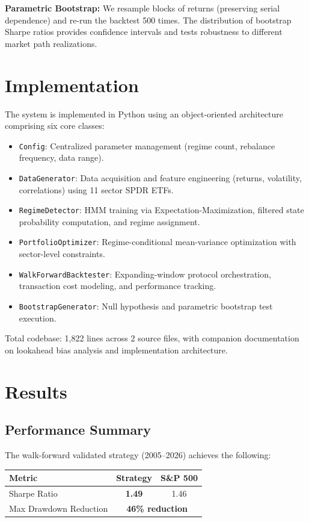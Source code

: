 \documentclass[11pt]{article}
\begin{document}
\textbf{Parametric Bootstrap:} We resample blocks of returns (preserving serial dependence) and re-run the backtest 500 times. The distribution of bootstrap Sharpe ratios provides confidence intervals and tests robustness to different market path realizations.

\section{Implementation}

The system is implemented in Python using an object-oriented architecture comprising six core classes:

\begin{itemize}[nosep]
    \item \texttt{Config}: Centralized parameter management (regime count, rebalance frequency, data range).
    \item \texttt{DataGenerator}: Data acquisition and feature engineering (returns, volatility, correlations) using 11 sector SPDR ETFs.
    \item \texttt{RegimeDetector}: HMM training via Expectation-Maximization, filtered state probability computation, and regime assignment.
    \item \texttt{PortfolioOptimizer}: Regime-conditional mean-variance optimization with sector-level constraints.
    \item \texttt{WalkForwardBacktester}: Expanding-window protocol orchestration, transaction cost modeling, and performance tracking.
    \item \texttt{BootstrapGenerator}: Null hypothesis and parametric bootstrap test execution.
\end{itemize}

Total codebase: 1,822 lines across 2 source files, with companion documentation on lookahead bias analysis and implementation architecture.

\section{Results}

\subsection{Performance Summary}

The walk-forward validated strategy (2005--2026) achieves the following:

\begin{table}[H]
\centering
\begin{tabular}{lcc}
\toprule
\textbf{Metric} & \textbf{Strategy} & \textbf{S\&P 500} \\
\midrule
Sharpe Ratio & \textbf{1.49} & 1.46 \\
Max Drawdown Reduction & \multicolumn{2}{c}{\textbf{46\% reduction}} \\
\bottomrule
\end{tabular}
\end{table}
\end{document}
